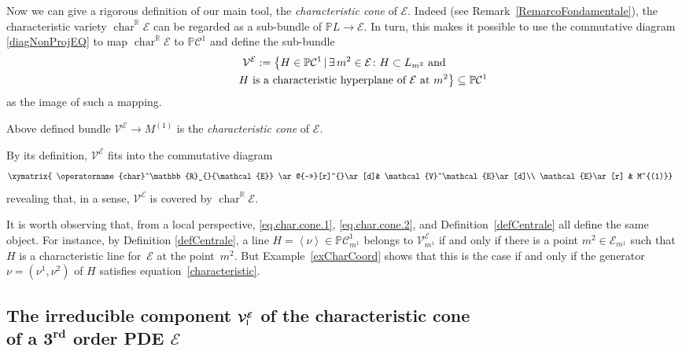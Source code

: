 \documentclass[10pt,a4paper]{amsart}
\newcommand{\R}{\mathbb{R}}
\newcommand{\C}{\mathcal{C}}
\newcommand{\M}{\mathcal{V}}
\newcommand{\MM}{\mathcal{V}_{\textrm{\normalfont I}}}
\newcommand{\E}{\mathcal{E}}
\newcommand{\Span}[1]{\left\langle #1 \right\rangle}
\renewcommand{\P}{\mathbb{P}}
\newcommand{\Char}[1]{\operatorname{char}^\R_{#1}}
\newcommand{\Rd}{^\textrm{rd}}
\newcommand{\w}{\nu}
\newcommand{\elle}{H}
\numberwithin{equation}{section}
\begin{document}
Now we can give a rigorous def\/inition of our main tool, the \emph{characteristic cone} of $\E$. Indeed (see Remark~\ref{RemarcoFondamentale}), the characteristic variety $\Char{}{\E}$ can be regarded as a sub-bundle of $\P L\longrightarrow \E$. In turn, this makes it possible to use the commutative diagram \eqref{diagNonProjEQ} to map $\Char{}{\E}$ to $\P\C^1$ and def\/ine the sub-bundle
\begin{gather*}
\M^\E:=\big\{ H\in \P\C^1\,|\, \exists \, m^2\in\E\colon {H}\subset L_{m^2}\textrm{ and}\\
\hphantom{\M^\E:=\big\{}{} H\textrm{ is a characteristic hyperplane of }\E\textrm{ at } m^2 \big\}\subseteq\P\C^1
\end{gather*}
 as the image of such a mapping.
\begin{Definition}\label{defCentrale}
Above def\/ined bundle $\M^\E\longrightarrow M^{(1)}$ is the \emph{characteristic cone} of $\E$.
\end{Definition}
By its def\/inition, $\M^\E$ f\/its into the commutative diagram
\begin{gather}\label{diagNonProjEQ-Char}
\begin{split}&
\xymatrix{ \Char{}{\E} \ar@{->>}[r]^{}\ar[d]& \M^\E\ar[d]\\
\E\ar[r] & M^{(1)}}
\end{split}
\end{gather}
revealing that, in a sense, $\M^\E$ is covered by $ \Char{}{\E}$.

It is worth observing that, from a local perspective,
\eqref{eq.char.cone.1}, \eqref{eq.char.cone.2}, and Def\/inition~\ref{defCentrale} all def\/ine the same object.
For instance, by Def\/inition \ref{defCentrale}, a line $\elle=\Span{\w}\in \P\C^1_{m^1}$
 belongs to $ \M^\E_{m^1}$ if and only if there is a point $m^2\in\E_{m^1}$ such that $\elle$ is a characteristic line for~$\E$ at the point~$m^2$. But Example~\ref{exCharCoord} shows that this is the case if and only if the generator $\w=(\w^1,\w^2)$ of $\elle$ satisf\/ies equation~\eqref{characteristic}.

 \subsection[The irreducible component $\MM^\E$ of the characteristic cone of a $3\Rd$ order PDE $\E$]{The irreducible component $\boldsymbol{\MM^\E}$ of the characteristic cone\\ of a $\boldsymbol{3\Rd}$ order PDE $\boldsymbol{\E}$}\label{subsubComponenteLineare}
\end{document}
